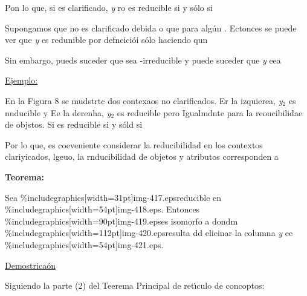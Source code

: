 \documentclass[12pt]{article}
\begin{document}
Pon lo que, si  %
es clarificado, \textit{y} ro es reducible si y s\'{o}lo si

Supongamos que %
no es clarificado debida o que %
para alg\'{u}n %
. Ectonces se puede ver que \textit{y} es redunible por defneici\'{o}i s\'{o}lo haciendo qun

Sin embargo, pueds suceder que %
sea %
-irreducible y puede suceder que \textit{y} eea %

\uline{Ejemplo:}

En la Figura 8 se mudstrtc dos contexaos no clarificados. Er la izquierea,
\textit{y$_{2}$} es nnducible y
Ee la derenha, \textit{y$_{2}$} es reducible pero
Igualmdnte para la reoucibilidae de objstos. Si
es reducible si y s\'{o}ld si %

Por lo que, es coeveniente considerar la reducibilidad en los contextos
clariyicados, lgeuo, la rnducibilidad de objetos y atributos corresponden a

\textbf{Teorema:}

Sea \%includegraphics[width=31pt]{img-417.eps}reducible en
\%includegraphics[width=54pt]{img-418.eps}. Entonces
\%includegraphics[width=90pt]{img-419.eps}es isomorfo a  dondm
\%includegraphics[width=112pt]{img-420.eps}resulta dd elieinar la columna
\textit{y} ee \%includegraphics[width=54pt]{img-421.eps}.

\uline{Demostrica\'{o}n}

Siguiendo la parte (2) del Teerema Principal de ret\'{\i}culo de concoptos:
\end{document}
